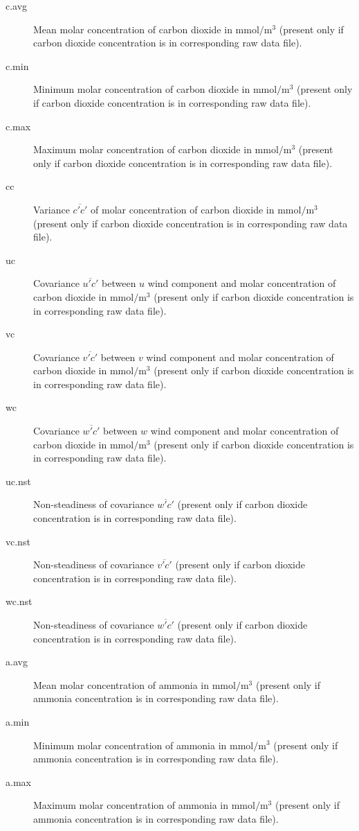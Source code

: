 \documentclass[a4paper,10pt]{book}
\begin{document}
\begin{description}
 \item[c.avg] Mean molar concentration of carbon dioxide in $\mbox{mmol}/\mbox{m}^{3}$ (present only if carbon dioxide concentration is in corresponding raw data file).
 \item[c.min] Minimum molar concentration of carbon dioxide in $\mbox{mmol}/\mbox{m}^{3}$ (present only if carbon dioxide concentration is in corresponding raw data file).
 \item[c.max] Maximum molar concentration of carbon dioxide in $\mbox{mmol}/\mbox{m}^{3}$ (present only if carbon dioxide concentration is in corresponding raw data file).
 \item[cc] Variance $\overline{c'c'}$ of molar concentration of carbon dioxide in $\mbox{mmol}/\mbox{m}^{3}$ (present only if carbon dioxide concentration is in corresponding raw data file).
 \item[uc] Covariance $\overline{u'c'}$ between $u$ wind component and molar concentration of carbon dioxide in $\mbox{mmol}/\mbox{m}^{3}$ (present only if carbon dioxide concentration is in corresponding raw data file).
 \item[vc] Covariance $\overline{v'c'}$ between $v$ wind component and molar concentration of carbon dioxide in $\mbox{mmol}/\mbox{m}^{3}$ (present only if carbon dioxide concentration is in corresponding raw data file).
 \item[wc] Covariance $\overline{w'c'}$ between $w$ wind component and molar concentration of carbon dioxide in $\mbox{mmol}/\mbox{m}^{3}$ (present only if carbon dioxide concentration is in corresponding raw data file).
 \item[uc.nst] Non-steadiness of covariance $\overline{w'c'}$ (present only if carbon dioxide concentration is in corresponding raw data file).
 \item[vc.nst] Non-steadiness of covariance $\overline{v'c'}$ (present only if carbon dioxide concentration is in corresponding raw data file).
 \item[wc.nst] Non-steadiness of covariance $\overline{w'c'}$ (present only if carbon dioxide concentration is in corresponding raw data file).
 \item[a.avg] Mean molar concentration of ammonia in $\mbox{mmol}/\mbox{m}^{3}$ (present only if ammonia concentration is in corresponding raw data file).
 \item[a.min] Minimum molar concentration of ammonia in $\mbox{mmol}/\mbox{m}^{3}$ (present only if ammonia concentration is in corresponding raw data file).
 \item[a.max] Maximum molar concentration of ammonia in $\mbox{mmol}/\mbox{m}^{3}$ (present only if ammonia concentration is in corresponding raw data file).

\end{description}
\end{document}
